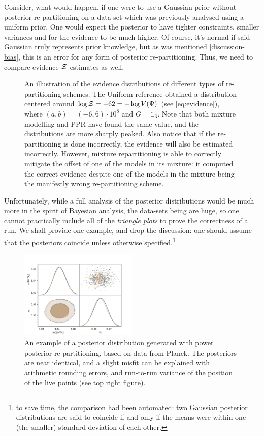 \documentclass[usenatbib]{mnras}
\begin{document}
Consider, what would happen, if one were to use a Gaussian prior
without posterior re-partitioning on a data set which was
previously analysed using a uniform prior. One would expect the
posterior to have tighter constraints, smaller variances and for
the evidence to be much higher. Of course, it's normal if said
Gaussian truly represents prior knowledge, but as was mentioned
\cref{discussion-bias}, this is an error for any form of posterior
re-partitioning. Thus, we need to compare evidence \({\cal Z}\)
estimates as well.

\begin{figure}

\caption{An illustration of the evidence distributions of different types of re-partitioning schemes. The Uniform reference obtained a distribution centered around \(\log {\cal Z} = -62 = - \log V(\Psi)\) (see \cref{eq:evidence}), where \((a,b)=(-6, 6)\cdot 10^{8}\) and \(G=\mathds{1}_{3}\). Note that both mixture modelling and PPR have found the same value, and the distributions are more sharply peaked. Also notice that if the re-partitioning is done incorrectly, the evidence will also be estimated incorrectly. However, mixture repartitioning is able to correctly mitigate the offset of one of the models in its mixture: it computed the correct evidence despite one of the models in the mixture being the manifestly wrong re-partitioning scheme.\label{fig:hist}}
\end{figure}

Unfortunately, while a full analysis of the posterior distributions
would be much more in the spirit of Bayesian analysis, the
data-sets being are huge, so one cannot practically include all of
the \emph{triangle plots} to prove the correctness of a run. We shall
provide one example, and drop the discussion: one should assume
that the posteriors coincide unless otherwise specified.\footnote{to save
time, the comparison had been automated: two Gaussian posterior
distributions are said to coincide if and only if the means were
within one (the smaller) standard deviation of each other.}

\begin{figure}
  \includegraphics[width=0.5\textwidth]{./illustrations/triangle-fit.pdf}
\caption{An example of a posterior distribution generated with power posterior re-partitioning, based on data from Planck. The posteriors are near identical, and a slight misfit can be explained with arithmetic rounding errors, and run-to-run variance of the position of the live points (see top right figure).\label{fig:overlay-posteriors}}
\end{figure}
\end{document}
